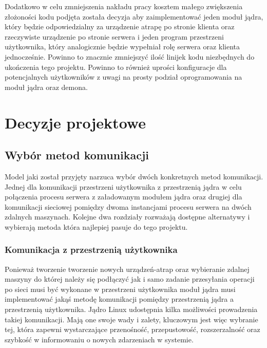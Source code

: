 \documentclass[10pt]{article}
\begin{document}
Dodatkowo w celu zmniejszenia nakładu pracy kosztem małego zwiększenia złożoności kodu podjęta została decyzja aby zaimplementować jeden moduł jądra, który będzie odpowiedzialny za urządzenie atrapę po stronie klienta oraz rzeczywiste urządzenie po stronie serwera i jeden program przestrzeni użytkownika, który analogicznie będzie wypełniał rolę serwera oraz klienta jednocześnie. Powinno to znacznie zmniejszyć ilość linijek kodu niezbędnych do ukończenia tego projektu. Powinno to również uprości konfiguracje dla potencjalnych użytkowników z uwagi na prosty podział oprogramowania na moduł jądra oraz demona.

\section{Decyzje projektowe}

\subsection{Wybór metod komunikacji}

Model jaki został przyjęty narzuca wybór dwóch konkretnych metod komunikacji. Jednej dla komunikacji przestrzeni użytkownika z przestrzenią jądra w celu połączenia procesu serwera z załadowanym modułem jądra oraz drugiej dla komunikacji sieciowej pomiędzy dwoma instancjami procesu serwera na dwóch zdalnych maszynach. Kolejne dwa rozdziały rozważają dostępne alternatywy i wybierają metoda która najlepiej pasuje do tego projektu.

\subsubsection{Komunikacja z przestrzenią użytkownika}
\label{userlandcomm}

Ponieważ tworzenie tworzenie nowych urządzeń-atrap oraz wybieranie zdalnej maszyny do której należy się podłączyć jak i samo zadanie przesyłania operacji po sieci musi być wykonane w przestrzeni użytkownika moduł jądra musi implementować jakąś metodę komunikacji pomiędzy przestrzenią jądra a przestrzenią użytkownika. Jądro Linux udostępnia kilka możliwości prowadzenia takiej komunikacji. Mają one swoje wady i zalety, kluczowym jest więc wybranie tej, która zapewni wystarczające przenośność, przepustowość, rozszerzalność oraz szybkość w informowaniu o nowych zdarzeniach w systemie.
\end{document}
